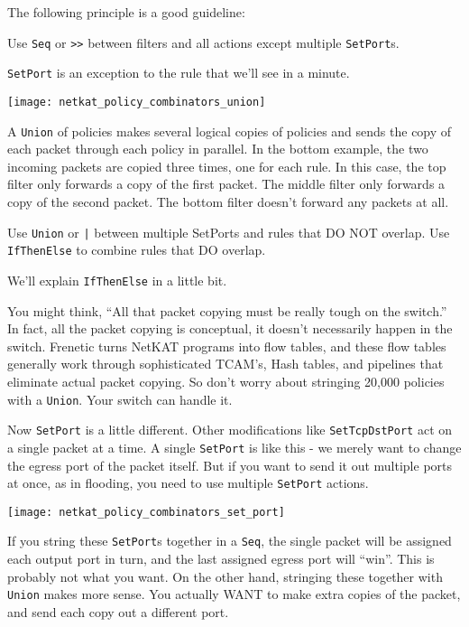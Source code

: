 The following principle is a good guideline:  

\begin{principle}
Use \texttt{Seq} or \texttt{>>} between filters and all actions except multiple \texttt{SetPort}s.
\end{principle}

\texttt{SetPort} is an exception to the rule that we'll see in a minute.  

\texttt{[image: netkat\_policy\_combinators\_union]}

A \texttt{Union} of policies makes several logical copies of policies and sends the copy of each packet
through each policy in parallel.  In the bottom example, the two incoming packets are copied three times, one
for each rule.  In this case, the top filter only forwards a copy of the first packet.
The middle filter only forwards a copy of the second packet.
The bottom filter doesn't forward any packets at all.  

\begin{principle}
Use \texttt{Union} or \texttt{|} between multiple SetPorts and rules that DO NOT overlap.
Use \texttt{IfThenElse} to combine rules that DO overlap. 
\end{principle}

We'll explain \texttt{IfThenElse} in a little bit.  

You might think, ``All that packet copying must be really tough on the switch.''  In fact, all the 
packet copying is conceptual, it doesn't necessarily happen in the switch.  Frenetic turns NetKAT
programs into flow tables, and these flow tables generally work through sophisticated TCAM's, Hash tables,
and pipelines that eliminate actual packet copying.  So don't worry about stringing 20,000 policies
with a \texttt{Union}.  Your switch can handle it.   

Now \texttt{SetPort} is a little different.  Other modifications like \texttt{SetTcpDstPort} act on a single packet at a time.
A single \texttt{SetPort} is like this - we merely want to change the egress port of the packet itself.  But if 
you want to send it out multiple ports at once, as in flooding, you need to use multiple \texttt{SetPort} actions.

\texttt{[image: netkat\_policy\_combinators\_set\_port]}

If you string these \texttt{SetPort}s together in a \texttt{Seq}, the single packet will be assigned each output port in turn, and
the last assigned egress port will ``win''.  
This is probably not what you want.  
On the other hand, stringing these together with \texttt{Union} makes more sense.  You actually WANT to make
extra copies of the packet, and send each copy out a different port.  

